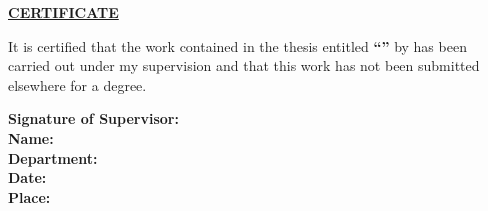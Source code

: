 
\begin{certificate}

\vspace{1cm}
\begin{center}
\textbf{\underline{CERTIFICATE}}
\end{center}

\vspace{0.8cm}

\noindent
It is certified that the work contained in the thesis entitled \textbf{``\ttitle''} by \textbf{\authorname} has been carried out under my supervision and that this work has not been submitted elsewhere for a degree.

\vspace{2cm}


\flushleft
\textbf{Signature of Supervisor:}\\
\textbf{Name:} \supervisorname \\
\textbf{Department:} \deptname \\ %
\textbf{Date:} \tdate\\ %
\textbf{Place:} \place %


%
%
%
%

\end{certificate}

